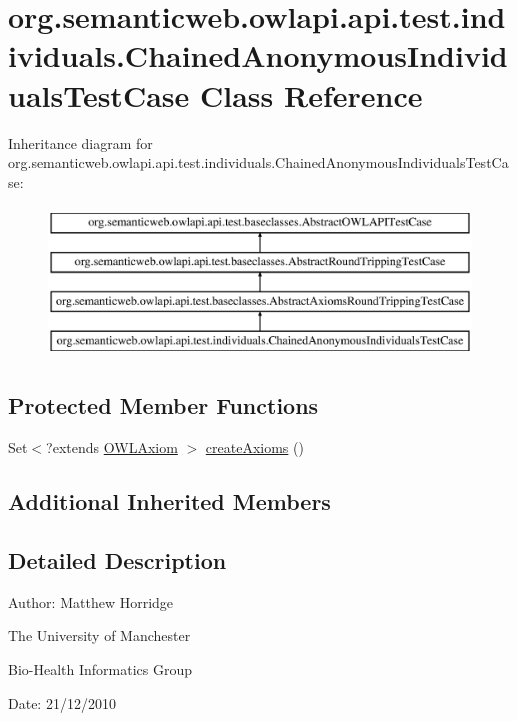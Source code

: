 \hypertarget{classorg_1_1semanticweb_1_1owlapi_1_1api_1_1test_1_1individuals_1_1_chained_anonymous_individuals_test_case}{\section{org.\-semanticweb.\-owlapi.\-api.\-test.\-individuals.\-Chained\-Anonymous\-Individuals\-Test\-Case Class Reference}
\label{classorg_1_1semanticweb_1_1owlapi_1_1api_1_1test_1_1individuals_1_1_chained_anonymous_individuals_test_case}
}
Inheritance diagram for org.\-semanticweb.\-owlapi.\-api.\-test.\-individuals.\-Chained\-Anonymous\-Individuals\-Test\-Case\-:\begin{figure}[H]
\begin{center}
\leavevmode
\includegraphics[height=4.000000cm]{classorg_1_1semanticweb_1_1owlapi_1_1api_1_1test_1_1individuals_1_1_chained_anonymous_individuals_test_case}
\end{center}
\end{figure}
\subsection*{Protected Member Functions}
\begin{DoxyCompactItemize}
\item 
Set$<$?extends \hyperlink{interfaceorg_1_1semanticweb_1_1owlapi_1_1model_1_1_o_w_l_axiom}{O\-W\-L\-Axiom} $>$ \hyperlink{classorg_1_1semanticweb_1_1owlapi_1_1api_1_1test_1_1individuals_1_1_chained_anonymous_individuals_test_case_af44d53d08235ce7bc380485e73cace19}{create\-Axioms} ()
\end{DoxyCompactItemize}
\subsection*{Additional Inherited Members}


\subsection{Detailed Description}
Author\-: Matthew Horridge\par
 The University of Manchester\par
 Bio-\/\-Health Informatics Group\par
 Date\-: 21/12/2010 

